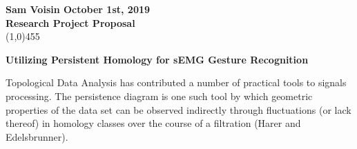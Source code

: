 \documentclass[11pt]{article}
\begin{document}
\noindent \textbf{Sam Voisin  \hfill  October 1st, 2019} \\
\noindent \textbf{Research Project Proposal} \\
\line(1,0){455}

\begin{center}
\Large{{\bf Utilizing Persistent Homology for sEMG Gesture Recognition}}\\
\end{center}

Topological Data Analysis has contributed a number of practical tools to signals processing. The persistence diagram is one such tool by which geometric properties of the data set can be observed indirectly through fluctuations (or lack thereof) in homology classes over the course of a filtration (Harer and Edelsbrunner).
  
\end{document}
